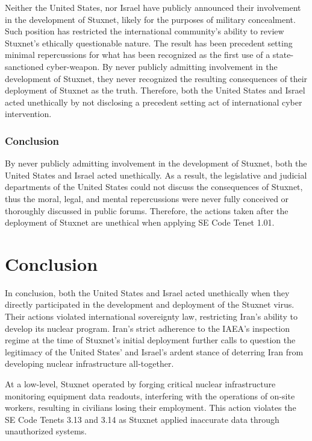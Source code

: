 \documentclass[12pt]{article}
\begin{document}
\begin{multicols}{2}
Neither the United States, nor Israel have publicly announced their involvement in the development of Stuxnet, likely for the purposes of military concealment. Such position has restricted the international community's ability to review Stuxnet's ethically questionable nature. The result has been precedent setting minimal repercussions for what has been recognized as the first use of a state-sanctioned cyber-weapon. By never publicly admitting involvement in the development of Stuxnet, they never recognized the resulting consequences of their deployment of Stuxnet as the truth. Therefore, both the United States and Israel acted unethically by not disclosing a precedent setting act of international cyber intervention.

\subsubsection{Conclusion}

By never publicly admitting involvement in the development of Stuxnet, both the United States and Israel acted unethically. As a result, the legislative and judicial departments of the United States could not discuss the consequences of Stuxnet, thus the moral, legal, and mental repercussions were never fully conceived or thoroughly discussed in public forums. Therefore, the actions taken after the deployment of Stuxnet are unethical when applying SE Code Tenet 1.01.


\section{Conclusion}

In conclusion, both the United States and Israel acted unethically when they directly participated in the development and deployment of the Stuxnet virus. Their actions violated international sovereignty law, restricting Iran's ability to develop its nuclear program. Iran's strict adherence to the IAEA's inspection regime at the time of Stuxnet's initial deployment further calls to question the legitimacy of the United States' and Israel's ardent stance of deterring Iran from developing nuclear infrastructure all-together.

At a low-level, Stuxnet operated by forging critical nuclear infrastructure monitoring equipment data readouts, interfering with the operations of on-site workers, resulting in civilians losing their employment. This action violates the SE Code Tenets 3.13 and 3.14 as Stuxnet applied inaccurate data through unauthorized systems.


\end{multicols}
\end{document}
